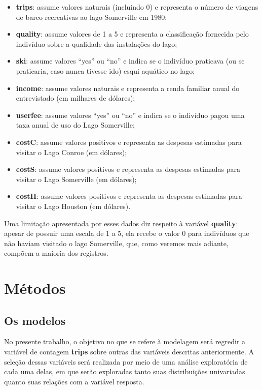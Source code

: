 \documentclass[
  twocolumn]{article}
\providecommand{\tightlist}{%
  \setlength{\itemsep}{0pt}\setlength{\parskip}{0pt}}
\begin{document}
\begin{itemize}
\tightlist
\item
  \textbf{trips}: assume valores naturais (incluindo 0) e representa o
  número de viagens de barco recreativas ao lago Somerville em 1980;
\item
  \textbf{quality}: assume valores de 1 a 5 e representa a classificação
  fornecida pelo indivíduo sobre a qualidade das instalações do lago;
\item
  \textbf{ski}: assume valores ``yes'' ou ``no'' e indica se o indivíduo
  praticava (ou se praticaria, caso nunca tivesse ido) esqui aquático no
  lago;
\item
  \textbf{income}: assume valores naturais e representa a renda familiar
  anual do entrevistado (em milhares de dólares);
\item
  \textbf{userfee}: assume valores ``yes'' ou ``no'' e indica se o
  indivíduo pagou uma taxa anual de uso do Lago Somerville;
\item
  \textbf{costC}: assume valores positivos e representa as despesas
  estimadas para visitar o Lago Conroe (em dólares);
\item
  \textbf{costS}: assume valores positivos e representa as despesas
  estimadas para visitar o Lago Somerville (em dólares);
\item
  \textbf{costH}: assume valores positivos e representa as despesas
  estimadas para visitar o Lago Houston (em dólares).
\end{itemize}

Uma limitação apresentada por esses dados diz respeito à variável
\textbf{quality}: apesar de possuir uma escala de 1 a 5, ela recebe o
valor 0 para indivíduos que não haviam visitado o lago Somerville, que,
como veremos mais adiante, compõem a maioria dos registros.

\section{Métodos}\label{muxe9todos}

\subsection{Os modelos}\label{os-modelos}

No presente trabalho, o objetivo no que se refere à modelagem será
regredir a variável de contagem \textbf{trips} sobre outras das
variáveis descritas anteriormente. A seleção dessas variáveis será
realizada por meio de uma análise exploratória de cada uma delas, em que
serão exploradas tanto suas distribuições univariadas quanto suas
relações com a variável resposta.
\end{document}
